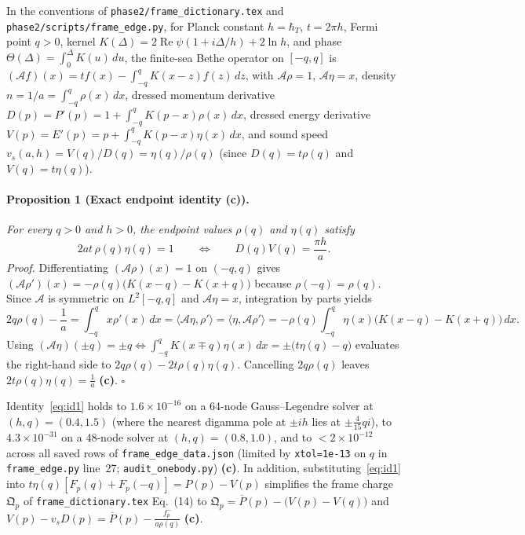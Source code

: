\documentclass[11pt,a4paper]{article}
\newcommand{\claim}[1]{\textbf{(#1)}}
\begin{document}
In the conventions of \texttt{phase2/frame\_dictionary.tex} and \texttt{phase2/scripts/frame\_edge.py},
for Planck constant $h = \hbar_T$, $t = 2\pi h$, Fermi point $q>0$, kernel
$K(\Delta) = 2\operatorname{Re}\psi(1+i\Delta/h) + 2\ln h$, and phase
$\Theta(\Delta) = \int_0^\Delta K(u)\,du$, the finite-sea Bethe operator on $[-q,q]$ is
$(\mathcal{A}f)(x) = tf(x) - \int_{-q}^q K(x-z)f(z)\,dz$, with
$\mathcal{A}\rho = 1$, $\mathcal{A}\eta = x$, density $n = 1/a = \int_{-q}^q\rho(x)\,dx$,
dressed momentum derivative $D(p) = P'(p) = 1 + \int_{-q}^q K(p-x)\rho(x)\,dx$,
dressed energy derivative $V(p) = E'(p) = p + \int_{-q}^q K(p-x)\eta(x)\,dx$,
and sound speed $v_s(a,h) = V(q)/D(q) = \eta(q)/\rho(q)$ (since $D(q)=t\rho(q)$ and $V(q)=t\eta(q)$).

\paragraph{Proposition 1 (Exact endpoint identity \claim{c}).}
\emph{For every $q>0$ and $h>0$, the endpoint values $\rho(q)$ and $\eta(q)$ satisfy}
\begin{equation}
  2at\,\rho(q)\eta(q) = 1 \qquad\Longleftrightarrow\qquad
  D(q)V(q) = \frac{\pi h}{a}.
  \label{eq:id1}
\end{equation}
\emph{Proof.} Differentiating $(\mathcal{A}\rho)(x)=1$ on $(-q,q)$ gives
$(\mathcal{A}\rho')(x) = -\rho(q)\bigl(K(x-q)-K(x+q)\bigr)$ because $\rho(-q)=\rho(q)$.
Since $\mathcal{A}$ is symmetric on $L^2[-q,q]$ and $\mathcal{A}\eta = x$, integration by parts yields
\begin{equation}
  2q\rho(q) - \frac{1}{a} = \int_{-q}^q x\rho'(x)\,dx
  = \langle\mathcal{A}\eta,\rho'\rangle = \langle\eta,\mathcal{A}\rho'\rangle
  = -\rho(q)\int_{-q}^q \eta(x)\bigl(K(x-q)-K(x+q)\bigr)\,dx.
\end{equation}
Using $(\mathcal{A}\eta)(\pm q) = \pm q \iff \int_{-q}^q K(x\mp q)\eta(x)\,dx = \pm\bigl(t\eta(q)-q\bigr)$
evaluates the right-hand side to $2q\rho(q) - 2t\rho(q)\eta(q)$. Cancelling $2q\rho(q)$ leaves
$2t\rho(q)\eta(q) = \frac{1}{a}$ \claim{c}. $\square$

Identity~\eqref{eq:id1} holds to $1.6\times 10^{-16}$ on a 64-node Gauss--Legendre solver at $(h,q)=(0.4,1.5)$
(where the nearest digamma pole at $\pm ih$ lies at $\pm\frac{4}{15}qi$), to $4.3\times 10^{-31}$ on a 48-node
solver at $(h,q)=(0.8,1.0)$, and to $<2\times 10^{-12}$ across all saved rows of \texttt{frame\_edge\_data.json}
(limited by \texttt{xtol=1e-13} on $q$ in \texttt{frame\_edge.py} line~27; \texttt{audit\_onebody.py}) \claim{c}.
In addition, substituting~\eqref{eq:id1} into $t\eta(q)[F_p(q)+F_p(-q)] = P(p)-V(p)$ simplifies
the frame charge $\mathfrak{Q}_p$ of \texttt{frame\_dictionary.tex} Eq.~(14) to
$\mathfrak{Q}_p = \overline{P}(p) - \bigl(V(p)-V(q)\bigr)$ and
$V(p) - v_s D(p) = \overline{P}(p) - \frac{f_p^-}{a\rho(q)}$ \claim{c}.
\end{document}
